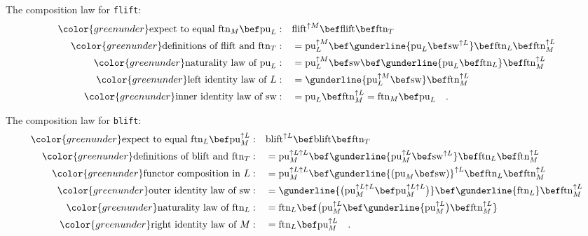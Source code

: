 The composition law for \lstinline!flift!:
\begin{align*}
{\color{greenunder}\text{expect to equal }\text{ftn}_{M}\bef\text{pu}_{L}:}\quad & \text{flift}^{\uparrow M}\bef\text{flift}\bef\text{ftn}_{T}\\
{\color{greenunder}\text{definitions of }\text{flift}\text{ and }\text{ftn}_{T}:}\quad & =\text{pu}_{L}^{\uparrow M}\bef\gunderline{\text{pu}_{L}\bef\text{sw}^{\uparrow L}}\bef\text{ftn}_{L}\bef\text{ftn}_{M}^{\uparrow L}\\
{\color{greenunder}\text{naturality law of }\text{pu}_{L}:}\quad & =\text{pu}_{L}^{\uparrow M}\bef\text{sw}\bef\gunderline{\text{pu}_{L}\bef\text{ftn}_{L}}\bef\text{ftn}_{M}^{\uparrow L}\\
{\color{greenunder}\text{left identity law of }L:}\quad & =\gunderline{\text{pu}_{L}^{\uparrow M}\bef\text{sw}}\bef\text{ftn}_{M}^{\uparrow L}\\
{\color{greenunder}\text{inner identity law of }\text{sw}:}\quad & =\text{pu}_{L}\bef\text{ftn}_{M}^{\uparrow L}=\text{ftn}_{M}\bef\text{pu}_{L}\quad.
\end{align*}

The composition law for \lstinline!blift!:
\begin{align*}
{\color{greenunder}\text{expect to equal }\text{ftn}_{L}\bef\text{pu}_{M}^{\uparrow L}:}\quad & \text{blift}^{\uparrow L}\bef\text{blift}\bef\text{ftn}_{T}\\
{\color{greenunder}\text{definitions of }\text{blift}\text{ and }\text{ftn}_{T}:}\quad & =\text{pu}_{M}^{\uparrow L\uparrow L}\bef\gunderline{\text{pu}_{M}^{\uparrow L}\bef\text{sw}^{\uparrow L}}\bef\text{ftn}_{L}\bef\text{ftn}_{M}^{\uparrow L}\\
{\color{greenunder}\text{functor composition in }L:}\quad & =\text{pu}_{M}^{\uparrow L\uparrow L}\bef\gunderline{\left(\text{pu}_{M}\bef\text{sw}\right)}^{\uparrow L}\bef\text{ftn}_{L}\bef\text{ftn}_{M}^{\uparrow L}\\
{\color{greenunder}\text{outer identity law of }\text{sw}:}\quad & =\gunderline{\big(\text{pu}_{M}^{\uparrow L\uparrow L}\bef\text{pu}_{M}^{\uparrow L\uparrow L}\big)}\bef\gunderline{\text{ftn}_{L}}\bef\text{ftn}_{M}^{\uparrow L}\\
{\color{greenunder}\text{naturality law of }\text{ftn}_{L}:}\quad & =\text{ftn}_{L}\bef\big(\text{pu}_{M}^{\uparrow L}\bef\gunderline{\text{pu}_{M}^{\uparrow L}\big)\bef\text{ftn}_{M}^{\uparrow L}}\\
{\color{greenunder}\text{right identity law of }M:}\quad & =\text{ftn}_{L}\bef\text{pu}_{M}^{\uparrow L}\quad.
\end{align*}

